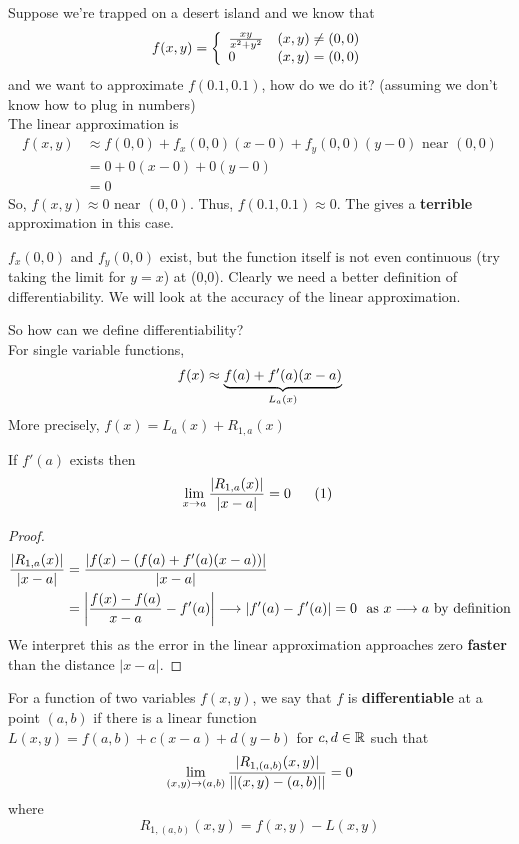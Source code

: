 \documentclass[english, 11pt]{article}
\begin{document}
  \begin{exmp}
    Suppose we're trapped on a desert island and we know that
    \[ f(x,y) = \left\{ \begin{array}{lr} \frac{xy}{x^2+y^2} & \mbox{$(x,y) \not = (0,0)$} \\ 0 & \mbox{$(x,y) = (0,0)$} \end{array} \right. \]
    and we want to approximate $f(0.1,0.1)$, how do we do it? (assuming we don't know how to plug in numbers)\\
    The linear approximation is
    \begin{align*}
     f(x,y) & \approx f(0,0) + f_x(0,0)(x-0) + f_y(0,0)(y-0) \mbox{ \ near $(0,0)$} \\
     & = 0 + 0(x-0) + 0(y-0) \\
     & = 0
     \end{align*}
     So, $f(x,y) \approx 0$ near $(0,0)$. Thus, $f(0.1,0.1) \approx 0$. The  gives a \textbf{terrible} approximation in this case.
  \end{exmp}

  \begin{note}
    $f_x(0,0)$ and $f_y(0,0)$ exist, but the function itself is not even continuous (try taking the limit for $y = x$) at (0,0). Clearly we need a better definition of differentiability. We will look at the accuracy of the linear approximation.
  \end{note}

  So how can we define differentiability? \\

  For single variable functions,
  \[ f(x) \approx \underbrace{f(a) + f'(a)(x-a)}_{L_a(x)} \]
  More precisely, $f(x) = L_a(x) + R_{1,a}(x)$
   \begin{thrm}
     If $f'(a)$ exists then
     \[ \lim_{x \rightarrow a} \frac{|R_{1,a}(x)|}{|x-a|} = 0 \mbox{ \ \ \ \ (1) } \]
   \end{thrm}
   \begin{proof}
     \begin{align*}
       \frac{|R_{1,a}(x)|}{|x-a|} & = \frac{|f(x) - (f(a) + f'(a)(x-a))|}{|x-a|} \\
       & = \left| \frac{f(x) - f(a)}{x-a} - f'(a) \right| \longrightarrow |f'(a) - f'(a)| = 0 \mbox{ \ as $x \longrightarrow a$ by definition}
     \end{align*}
     We interpret this as the error in the linear approximation approaches zero \textbf{faster} than the distance $|x-a|$.

   \end{proof}

  \begin{defn}[differentiable]\label{differentiable}
    For a function of two variables $f(x,y)$, we say that $f$ is \textbf{differentiable} at a point $(a,b)$ if there is a linear function $L(x,y) = f(a,b) + c(x-a) + d(y-b)$ for $c,d \in {\mathbb{R}}$ such that
    \[ \lim_{(x,y) \rightarrow (a,b)} \frac{|R_{1,(a,b)}(x,y)|}{||(x,y) - (a,b)||} = 0\]
    where
    \[ R_{1,(a,b)}(x,y) = f(x,y) - L(x,y) \]
  \end{defn}
\end{document}
